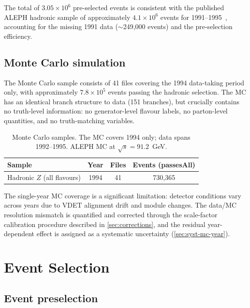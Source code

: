 \documentclass[11pt,a4paper]{article}
\begin{document}
The total of $3.05 \times 10^6$ pre-selected events is consistent with
the published ALEPH hadronic sample of approximately $4.1 \times 10^6$
events for 1991--1995~\cite{ALEPH:AFBb}, accounting for the missing 1991
data ($\sim$249,000 events) and the pre-selection efficiency.

\subsection{Monte Carlo simulation}

The Monte Carlo sample consists of 41 files covering the 1994 data-taking
period only, with approximately $7.8 \times 10^5$ events passing the
hadronic selection.  The MC has an identical branch structure to data
(151 branches), but crucially contains no truth-level information: no
generator-level flavour labels, no parton-level quantities, and no
truth-matching variables.

\begin{table}[htbp]
\centering
\caption{Monte Carlo samples.  The MC covers 1994 only; data spans
  1992--1995.  ALEPH MC at $\sqrt{s} = 91.2$~GeV.}
\label{tbl:mc}
\begin{tabular}{lccc}
\toprule
Sample & Year & Files & Events (passesAll) \\
\midrule
Hadronic $Z$ (all flavours) & 1994 & 41 & 730,365 \\
\bottomrule
\end{tabular}
\end{table}

The single-year MC coverage is a significant limitation: detector
conditions vary across years due to VDET alignment drift and module
changes.  The data/MC resolution mismatch is quantified and corrected
through the scale-factor calibration procedure described in
\cref{sec:corrections}, and the residual year-dependent effect is
assigned as a systematic uncertainty (\cref{sec:syst-mc-year}).

\section{Event Selection}
\label{sec:selection}

\subsection{Event preselection}
\end{document}
